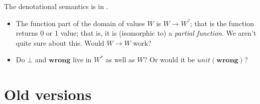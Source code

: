 \documentclass[acmsmall,review,dvipsnames]{acmart}
\newcommand{\Value}{W}
\newcommand{\mtype}{\Value^{*}}
\newcommand{\mtyped}{\Value^{?}}
\newcommand{\munit}{\mathit{unit}}
\newcommand{\wrong}{\mathbf{wrong}}
\begin{document}
The denotational semantics is in .

\begin{itemize}
\item The function part of the domain of values $\Value$ is $\Value
  \rightarrow \mtyped$; that is the function returns 0 or 1 value;
  that is, it is (isomorphic to) a \emph{partial function}.  We aren't
  quite sure about this.  Would $\Value \rightarrow \Value$ work?

\item Do $\bot$ and $\wrong$ live in $\mtype$ as well as $\Value$?  Or would it
  be $\munit(\wrong)$?
\end{itemize}

\appendix
\cleardoublepage

\section{Old versions}
\end{document}
